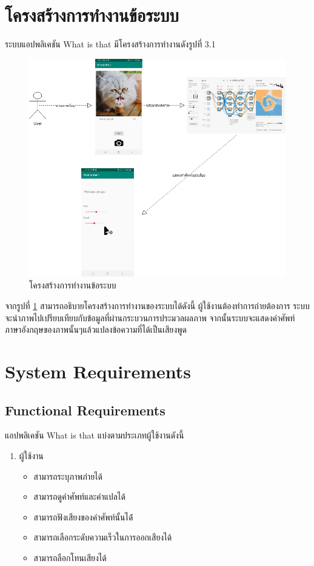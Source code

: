 \section{โครงสร้างการทำงานข้อระบบ}
 ระบบแอปพลิเคชัน What is that มีโครงสร้างการทำงานดังรูปที่ 3.1
   	\begin{figure}[H]
   		\centering
   		\includegraphics[width=\textwidth]{Figures/3/architecture/31.png}
   		\caption{โครงสร้างการทำงานข้อระบบ}
   		\label{Fig:architecture}
   	\end{figure}
   
	 		จากรูปที่ \ref{Fig:architecture} สามารถอธิบายโครงสร้างการทำงานของระบบได้ดังนี้ ผู้ใช้งานต้องทำการถ่ายต้องการ ระบบจะนำภาพไปเปรียบเทียบกับข้อมูลที่ผ่านกระบวนการประมวลผลภาพ
 จากนั้นระบบจะแสดงคำศัพท์ภาษาอังกฤษของภาพนั้นๆแล้วแปลงข้อความที่ได้เป็นเสียงพูด 
   

\section{System Requirements}
		\subsection{Functional Requirements} 
แอปพลิเคชัน What is that แบ่งตามประเภทผู้ใช้งานดังนี้ 
\begin{enumerate}
		\item ผู้ใช้งาน
			\begin{itemize}[label={--}]
				\item สามารถระบุภาพภ่ายได้
				\item สามารถดูคำศัพท์และคำแปลได้
				\item สามารถฟังเสียงของคำศัพท์นั้นได้่
				\item สามารถเลือกระดับความเร็วในการออกเสียงได้ 
				\item สามารถลือกโทนเสียงได้
			\end{itemize}
			\end{enumerate}

